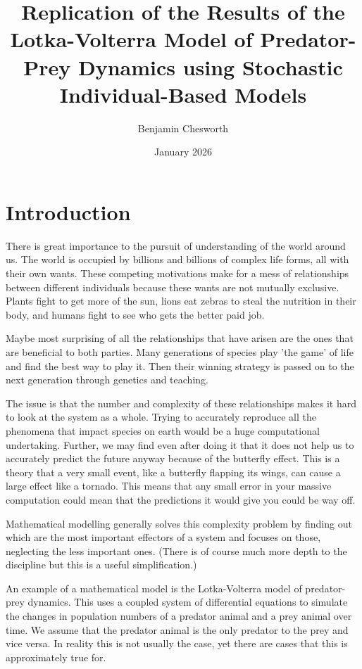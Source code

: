 \documentclass[12pt, a4paper]{article}
\title{Replication of the Results of the Lotka-Volterra Model of Predator-Prey Dynamics using Stochastic Individual-Based Models}
\author{Benjamin Chesworth}
\date{January 2026}
\begin{document}
\maketitle

\section{Introduction}

There is great importance to the pursuit of understanding of the world around us. The world is occupied by billions and billions of complex life forms, all with their own wants. These competing motivations make for a mess of relationships between different individuals because these wants are not mutually exclusive. Plants fight to get more of the sun, lions eat zebras to steal the nutrition in their body, and humans fight to see who gets the better paid job.

Maybe most surprising of all the relationships that have arisen are the ones that are beneficial to both parties. Many generations of species play 'the game' of life and find the best way to play it. Then their winning strategy is passed on to the next generation through genetics and teaching.

The issue is that the number and complexity of these relationships makes it hard to look at the system as a whole. Trying to accurately reproduce all the phenomena that impact species on earth would be a huge computational undertaking. Further, we may find even after doing it that it does not help us to accurately predict the future anyway because of the butterfly effect. This is a theory that a very small event, like a butterfly flapping its wings, can cause a large effect like a tornado. This means that any small error in your massive computation could mean that the predictions it would give you could be way off.

Mathematical modelling generally solves this complexity problem by finding out which are the most important effectors of a system and focuses on those, neglecting the less important ones. (There is of course much more depth to the discipline but this is a useful simplification.)

An example of a mathematical model is the Lotka-Volterra model of predator-prey dynamics. This uses a coupled system of differential equations to simulate the changes in population numbers of a predator animal and a prey animal over time. We assume that the predator animal is the only predator to the prey and vice versa. In reality this is not usually the case, yet there are cases that this is approximately true for.
\end{document}
